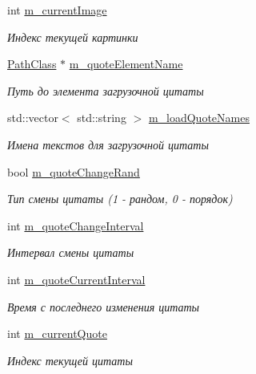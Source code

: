 \begin{DoxyCompactItemize}
int \hyperlink{class_load_screen_manager_class_a488c0f089f3236ae2f499dc87c78d005}{m\+\_\+current\+Image}
\begin{DoxyCompactList}\small\item\em Индекс текущей картинки \end{DoxyCompactList}\item 
\hyperlink{class_path_class}{Path\+Class} $\ast$ \hyperlink{class_load_screen_manager_class_ac034597d07c48042e9dde3e4e1bd489e}{m\+\_\+quote\+Element\+Name}
\begin{DoxyCompactList}\small\item\em Путь до элемента загрузочной цитаты \end{DoxyCompactList}\item 
std\+::vector$<$ std\+::string $>$ \hyperlink{class_load_screen_manager_class_accc397cb95d4435f9c0cd21914dae1a1}{m\+\_\+load\+Quote\+Names}
\begin{DoxyCompactList}\small\item\em Имена текстов для загрузочной цитаты \end{DoxyCompactList}\item 
bool \hyperlink{class_load_screen_manager_class_acb4939c8fd42e0ab79e4426151a57f58}{m\+\_\+quote\+Change\+Rand}
\begin{DoxyCompactList}\small\item\em Тип смены цитаты (1 -\/ рандом, 0 -\/ порядок) \end{DoxyCompactList}\item 
int \hyperlink{class_load_screen_manager_class_a78865abb74cee7409a95fe6378fdd80a}{m\+\_\+quote\+Change\+Interval}
\begin{DoxyCompactList}\small\item\em Интервал смены цитаты \end{DoxyCompactList}\item 
int \hyperlink{class_load_screen_manager_class_a4e31f6e1bbc0435e6017f69909c53b9b}{m\+\_\+quote\+Current\+Interval}
\begin{DoxyCompactList}\small\item\em Время с последнего изменения цитаты \end{DoxyCompactList}\item 
int \hyperlink{class_load_screen_manager_class_a76398d3071bdae770a53e4170f799c08}{m\+\_\+current\+Quote}
\begin{DoxyCompactList}\small\item\em Индекс текущей цитаты \end{DoxyCompactList}\item 

\end{DoxyCompactItemize}
